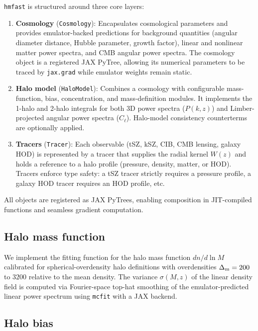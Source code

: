 \documentclass[12pt, preprint]{aastex631}
\begin{document}
\texttt{hmfast} is structured around three core layers:

\begin{enumerate}
    \item \textbf{Cosmology} (\texttt{Cosmology}): Encapsulates cosmological parameters and provides emulator-backed predictions for background quantities (angular diameter distance, Hubble parameter, growth factor), linear and nonlinear matter power spectra, and CMB angular power spectra. The cosmology object is a registered JAX PyTree, allowing its numerical parameters to be traced by \texttt{jax.grad} while emulator weights remain static.

    \item \textbf{Halo model} (\texttt{HaloModel}): Combines a cosmology with configurable mass-function, bias, concentration, and mass-definition modules. It implements the 1-halo and 2-halo integrals for both 3D power spectra ($P(k,z)$) and Limber-projected angular power spectra ($C_\ell$). Halo-model consistency counterterms are optionally applied.

    \item \textbf{Tracers} (\texttt{Tracer}): Each observable (tSZ, kSZ, CIB, CMB lensing, galaxy HOD) is represented by a tracer that supplies the radial kernel $W(z)$ and holds a reference to a halo profile (pressure, density, matter, or HOD). Tracers enforce type safety: a tSZ tracer strictly requires a pressure profile, a galaxy HOD tracer requires an HOD profile, etc.
\end{enumerate}

All objects are registered as JAX PyTrees, enabling composition in JIT-compiled functions and seamless gradient computation.

\subsection{Halo mass function}

We implement the \citet{Tinker2008} fitting function for the halo mass function $dn/d\ln M$ calibrated for spherical-overdensity halo definitions with overdensities $\Delta_{\rm m} = 200$ to $3200$ relative to the mean density. The variance $\sigma(M,z)$ of the linear density field is computed via Fourier-space top-hat smoothing of the emulator-predicted linear power spectrum using \texttt{mcfit} with a JAX backend.

\subsection{Halo bias}
\end{document}
